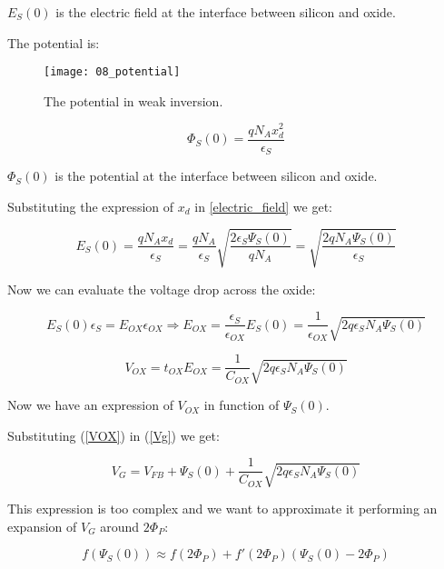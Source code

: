 \documentclass[a4paper, 12pt, twoside, openright]{report}
\begin{document}
$E_{S}(0)$ is the electric field at the interface between silicon and oxide.

The potential is:

	\begin{figure}[H]
	\centering
	\texttt{[image: 08\_potential]}
	\caption{The potential in weak inversion.}
	\label{}
	\end{figure}

\begin{equation}
\Phi_S(0) = \frac{qN_Ax_d^2}{\epsilon_S}
\label{}
\end{equation}

$\Phi_S(0)$ is the potential at the interface between silicon and oxide.

Substituting the expression of $x_{d}$ in \ref{electric_field} we get:

\begin{equation}
E_S(0) = \frac{qN_Ax_d}{\epsilon_S} = \frac{qN_A}{\epsilon_S} \sqrt{\frac{2\epsilon_S\Psi_S(0)}{qN_A}} = \sqrt{\frac{2 qN_A \Psi_S(0)}{\epsilon_S}}
\label{}
\end{equation}

Now we can evaluate the voltage drop across the oxide:

\begin{equation}
E_S(0) \epsilon_S = E_{OX} \epsilon_{OX} \Rightarrow E_{OX} = \frac{\epsilon_S}{\epsilon_{OX}}E_S(0) = \frac{1}{\epsilon_{OX}} \sqrt{2q \epsilon_S N_A \Psi_S(0)}
\label{}
\end{equation}

\begin{equation}
V_{OX} = t_{OX} E_{OX} = \frac{1}{C_{OX}} \sqrt{2q \epsilon_S N_A \Psi_S(0)}
\label{VOX}
\end{equation}

Now we have an expression of $V_{OX}$ in function of $\Psi_S(0)$.

Substituting (\ref{VOX}) in (\ref{Vg}) we get:

\begin{equation}
V_G = V_{FB} + \Psi_S(0) + \frac{1}{C_{OX}} \sqrt{2q \epsilon_S N_A \Psi_S(0)}
\label{}
\end{equation}

This expression is too complex and we want to approximate it performing an expansion of $V_{G}$ around $2\Phi_P$:

\begin{equation}
f(\Psi_S(0)) \approx f(2\Phi_P) + f'(2\Phi_P)(\Psi_S(0) - 2\Phi_P)
\label{}
\end{equation}
\end{document}
